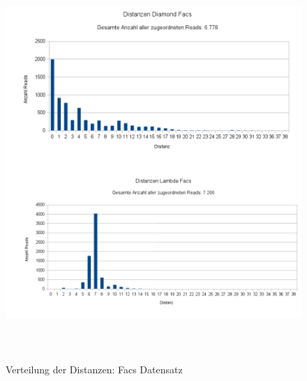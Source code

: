 \documentclass[10pt, a4paper]{article}[08.12.2015]
\begin{document}
    \begin{figure}[H]
      \centering
      \noindent\includegraphics[width=\linewidth,height=15cm,
      keepaspectratio]{Abbildungen/Facs_Distanzen_both.png}
      \caption{Verteilung der Distanzen: Facs Datensatz}
    \end{figure}
    
\end{document}
